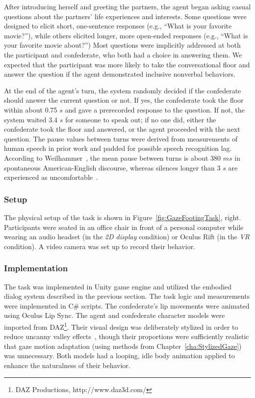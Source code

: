 After introducing herself and greeting the partners, the agent began asking casual questions about the partners' life experiences and interests. Some questions were designed to elicit short, one-sentence responses (e.g., ``What is your favorite movie?''), while others elicited longer, more open-ended responses (e.g., ``What is your favorite movie about?'') Most questions were implicitly addressed at both the participant and confederate, who both had a choice in answering them. We expected that the participant was more likely to take the conversational floor and answer the question if the agent demonstrated inclusive nonverbal behaviors.

At the end of the agent's turn, the system randomly decided if the confederate should answer the current question or not. If yes, the confederate took the floor within about 0.75 $s$ and gave a prerecorded response to the question. If not, the system waited 3.4 $s$ for someone to speak out; if no one did, either the confederate took the floor and answered, or the agent proceeded with the next question. The pause values between turns were derived from measurements of human speech in prior work and padded for possible speech recognition lag. According to Weilhammer~\citep{weilhammer2003durational}, the mean pause between turns is about 380 $ms$ in spontaneous American-English discourse, whereas silences longer than 3 $s$ are experienced as uncomfortable~\citep{mclaughlin1982awkward}.

\subsubsection{Setup}

The physical setup of the task is shown in Figure~\ref{fig:GazeFootingTask}, right. Participants were seated in an office chair in front of a personal computer while wearing an audio headset (in the \emph{2D display} condition) or Oculus Rift (in the \emph{VR} condition). A video camera was set up to record their behavior.

\subsubsection{Implementation}

The task was implemented in Unity game engine and utilized the embodied dialog system described in the previous section. The task logic and measurements were implemented in C\# scripts. The confederate's lip movements were animated using Oculus Lip Sync. The agent and confederate character models were imported from DAZ\footnote{DAZ Productions, http://www.daz3d.com/}. Their visual design was deliberately stylized in order to reduce uncanny valley effects~\citep{mori2012uncanny}, though their proportions were sufficiently realistic that gaze motion adaptation (using methods from Chapter~\ref{cha:StylizedGaze}) was unnecessary. Both models had a looping, idle body animation applied to enhance the naturalness of their behavior.

